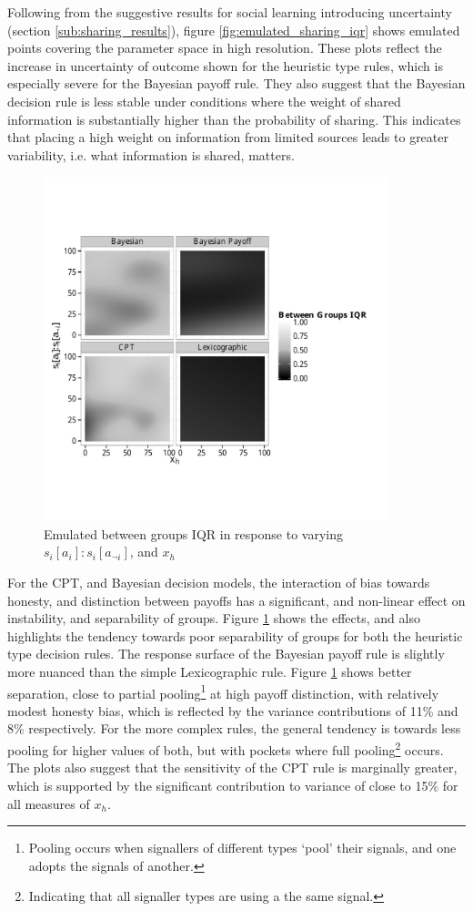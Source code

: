 Following from the suggestive results for social learning introducing uncertainty (section \ref{sub:sharing_results}), figure \ref{fig:emulated_sharing_iqr} shows emulated points covering the parameter space in high resolution. These plots reflect the increase in uncertainty of outcome shown for the heuristic type rules, which is especially severe for the Bayesian payoff rule. They also suggest that the Bayesian decision rule is less stable under conditions where the weight of shared information is substantially higher than the probability of sharing. This indicates that placing a high weight on information from limited sources leads to greater variability, i.e. what information is shared, matters.

\begin{figure}[H]
\includegraphics[width=100mm]{figures/unfixed_emu_payoff_honesty_group_iqr}
\caption{Emulated between groups IQR in response to varying \(s_{i}[a_{i}]:s_{i}[a_{\neg i}]\), and \(x_{h}\)}
\label{fig:emulated_payoff_group_iqr}
\end{figure}

For the \ac{CPT}, and Bayesian decision models, the interaction of bias towards honesty, and distinction between payoffs has a significant, and non-linear effect on instability, and separability of groups. Figure \ref{fig:emulated_payoff_group_iqr} shows the effects, and also highlights the tendency towards poor separability of groups for both the heuristic type decision rules. The response surface of the Bayesian payoff rule is slightly more nuanced than the simple Lexicographic rule. Figure \ref{fig:emulated_payoff_group_iqr} shows better separation, close to partial pooling\footnote{Pooling occurs when signallers of different types `pool' their signals, and one adopts the signals of another.} at high payoff distinction, with relatively modest honesty bias, which is reflected by the variance contributions of 11\% and 8\% respectively.  For the more complex rules, the general tendency is towards less pooling for higher values of both, but with pockets where full pooling\footnote{Indicating that all signaller types are using a the same signal.} occurs.  The plots also suggest that the sensitivity of the \ac{CPT} rule is marginally greater, which is supported by the significant contribution to variance of close to 15\% for all measures of \(x_{h}\).
